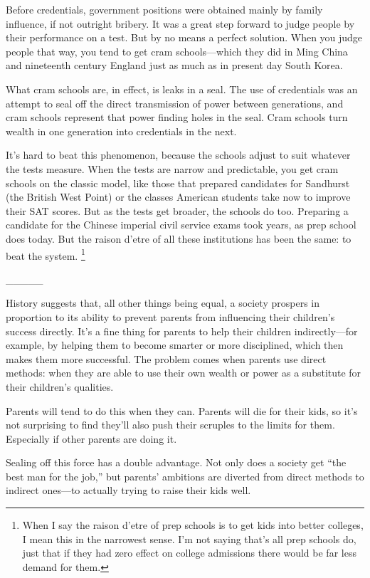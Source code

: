 Before credentials, government positions were obtained mainly by family
influence, if not outright bribery. It was a great step forward to judge
people by their performance on a test. But by no means a perfect
solution. When you judge people that way, you tend to get cram
schools---which they did in Ming China and nineteenth century England
just as much as in present day South Korea.

What cram schools are, in effect, is leaks in a seal. The use of
credentials was an attempt to seal off the direct transmission of power
between generations, and cram schools represent that power finding holes
in the seal. Cram schools turn wealth in one generation into credentials
in the next.

It's hard to beat this phenomenon, because the schools adjust to suit
whatever the tests measure. When the tests are narrow and predictable,
you get cram schools on the classic model, like those that prepared
candidates for Sandhurst (the British West Point) or the classes
American students take now to improve their SAT scores. But as the tests
get broader, the schools do too. Preparing a candidate for the Chinese
imperial civil service exams took years, as prep school does today. But
the raison d'etre of all these institutions has been the same: to beat
the system. \footnote{When I say the raison d'etre of prep schools is to get kids into
better colleges, I mean this in the narrowest sense. I'm not saying
that's all prep schools do, just that if they had zero effect on college
admissions there would be far less demand for them.}

\_\_\_\_\_

History suggests that, all other things being equal, a society prospers
in proportion to its ability to prevent parents from influencing their
children's success directly. It's a fine thing for parents to help their
children indirectly---for example, by helping them to become smarter or
more disciplined, which then makes them more successful. The problem
comes when parents use direct methods: when they are able to use their
own wealth or power as a substitute for their children's qualities.

Parents will tend to do this when they can. Parents will die for their
kids, so it's not surprising to find they'll also push their scruples to
the limits for them. Especially if other parents are doing it.

Sealing off this force has a double advantage. Not only does a society
get ``the best man for the job,'' but parents' ambitions are diverted
from direct methods to indirect ones---to actually trying to raise their
kids well.

